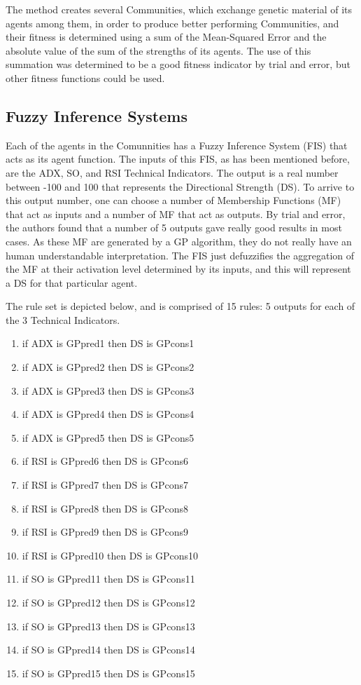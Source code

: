 \documentclass[12pt,journal,draftcls,onecolumn]{IEEEtran}
\begin{document}
The method creates several Communities, which exchange genetic material of its agents among them, in order to produce better performing Communities, and their fitness is determined using a sum of the Mean-Squared Error and the absolute value of the sum of the strengths of its agents. The use of this summation was determined to be a good fitness indicator by trial and error, but other fitness functions could be used.

\subsection{Fuzzy Inference Systems}

Each of the agents in the Comunnities has a Fuzzy Inference System (FIS) that acts as its agent function. The inputs of this FIS, as has been mentioned before, are the ADX, SO, and RSI Technical Indicators. The output is a real number between -100 and 100 that represents the Directional Strength (DS). To arrive to this output number, one can choose a number of Membership Functions (MF) that act as inputs and a number of MF that act as outputs. By trial and error, the authors found that a number of 5 outputs gave really good results in most cases. As these MF are generated by a GP algorithm, they do not really have an human understandable interpretation. The FIS just defuzzifies the aggregation of the MF at their activation level determined by its inputs, and this will represent a DS for that particular agent.

The rule set is depicted below, and is comprised of 15 rules: 5 outputs for each of the 3 Technical Indicators.

\begin{enumerate}
\item if ADX is GPpred1 then DS is GPcons1
\item if ADX is GPpred2 then DS is GPcons2
\item if ADX is GPpred3 then DS is GPcons3
\item if ADX is GPpred4 then DS is GPcons4
\item if ADX is GPpred5 then DS is GPcons5

\item if RSI is GPpred6 then DS is GPcons6
\item if RSI is GPpred7 then DS is GPcons7
\item if RSI is GPpred8 then DS is GPcons8
\item if RSI is GPpred9 then DS is GPcons9
\item if RSI is GPpred10 then DS is GPcons10

\item if SO is GPpred11 then DS is GPcons11
\item if SO is GPpred12 then DS is GPcons12
\item if SO is GPpred13 then DS is GPcons13
\item if SO is GPpred14 then DS is GPcons14
\item if SO is GPpred15 then DS is GPcons15
\end{enumerate}
\end{document}
